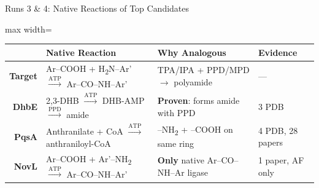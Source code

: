 \documentclass[aspectratio=169, 11pt]{beamer}
\begin{document}
\begin{frame}{Runs 3 \& 4: Native Reactions of Top Candidates}
\vspace{-6pt}

{\scriptsize
\begin{adjustbox}{max width=\textwidth}
\begin{tabular}{@{}r p{5.5cm} p{3.5cm} l@{}}
\toprule
 & \textbf{Native Reaction} & \textbf{Why Analogous} & \textbf{Evidence} \\
\midrule
\rowcolor{accentred!8}
\textbf{Target} & Ar--COOH + H\textsubscript{2}N--Ar' $\xrightarrow{\text{ATP}}$ Ar--CO--NH--Ar' & TPA/IPA + PPD/MPD $\rightarrow$ polyamide & --- \\[3pt]
\rowcolor{accentblue!8}
\textbf{DhbE} & 2,3-DHB $\xrightarrow{\text{ATP}}$ DHB-AMP $\xrightarrow{\text{PPD}}$ amide & \textbf{Proven}: forms amide with PPD & 3 PDB \\[3pt]
\rowcolor{accentorange!8}
\textbf{PqsA} & Anthranilate + CoA $\xrightarrow{\text{ATP}}$ anthraniloyl-CoA & --NH\textsubscript{2} + --COOH on same ring & 4 PDB, 28 papers \\[3pt]
\rowcolor{accentgreen!8}
\textbf{NovL} & Ar--COOH + Ar'--NH\textsubscript{2} $\xrightarrow{\text{ATP}}$ Ar--CO--NH--Ar' & \textbf{Only} native Ar--CO--NH--Ar ligase & 1 paper, AF only \\
\bottomrule
\end{tabular}
\end{adjustbox}
}


\end{frame}
\end{document}
